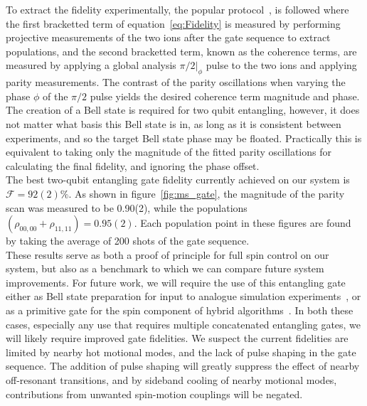     To extract the fidelity experimentally, the popular
    protocol~\cite{}, is followed where the first bracketted term of
    equation~\ref{eq:Fidelity} is measured by performing projective measurements
    of the two ions after the gate sequence to extract populations, and the second bracketted term,
    known as the coherence terms, are measured by applying a global analysis
    $\pi/2|_\phi$ pulse to the two ions and applying parity measurements.  The
    contrast of the parity oscillations when varying the phase $\phi$ of the
    $\pi/2$ pulse yields the desired coherence term magnitude and phase. The creation of a Bell state is required for two qubit entangling, however, it does not matter what basis this Bell state is in, as long as it is consistent between experiments, and so the target Bell state phase may be floated. Practically this is equivalent to taking only the magnitude of the fitted parity oscillations for calculating the final fidelity, and ignoring the phase offset.\\
    The best two-qubit entangling gate fidelity currently achieved on our system is $\mathcal{F}=92(2)\%$. As shown in figure~\ref{fig:ms_gate}, the magnitude of the parity scan was measured to be 0.90(2), while the populations $\left( \rho_{00,00} + \rho_{11,11} \right) = 0.95(2)$. Each population point in these figures are found by taking the average of 200 shots of the gate sequence.\\

    These results serve as both a proof of principle for full spin control on
    our system, but also as a benchmark to which we can compare future system
    improvements.  For future work, we will require the use of this entangling
    gate either as Bell state preparation for input to analogue simulation
    experiments~\cite{}, or as a primitive gate for the spin component of hybrid
    algorithms~\cite{}.  In both these cases, especially any use that requires
    multiple concatenated entangling gates, we will likely require improved gate
    fidelities. We suspect the current fidelities are limited by nearby hot
    motional modes, and the lack of pulse shaping in the gate sequence. The addition of pulse shaping will greatly suppress 
    the effect of nearby off-resonant transitions, and by sideband cooling of
    nearby motional modes, contributions from unwanted
    spin-motion couplings will be negated.\\
